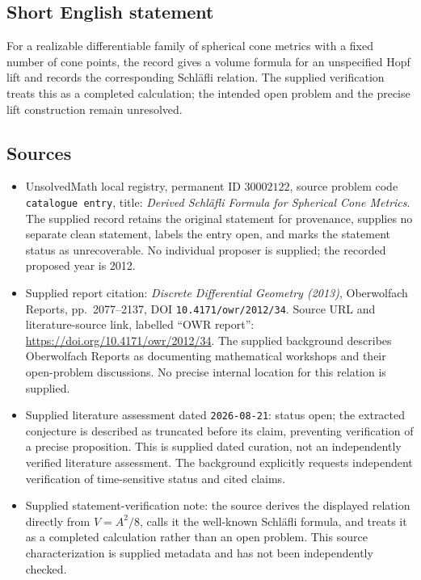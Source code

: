 \documentclass[11pt]{article}
\begin{document}
\subsection{Short English statement}
For a realizable differentiable family of spherical cone metrics with a fixed number of cone points, the record gives a volume formula for an unspecified Hopf lift and records the corresponding Schl\"afli relation. The supplied verification treats this as a completed calculation; the intended open problem and the precise lift construction remain unresolved.
\subsection{Sources}
\begin{itemize}
\item UnsolvedMath local registry, permanent ID \(30002122\), source problem code \texttt{catalogue entry}, title: \emph{Derived Schl\"afli Formula for Spherical Cone Metrics}. The supplied record retains the original statement for provenance, supplies no separate clean statement, labels the entry open, and marks the statement status as unrecoverable. No individual proposer is supplied; the recorded proposed year is 2012.
\item Supplied report citation: \emph{Discrete Differential Geometry (2013)}, Oberwolfach Reports, pp.\ 2077--2137, DOI \texttt{10.4171/owr/2012/34}. Source URL and literature-source link, labelled ``OWR report'': \url{https://doi.org/10.4171/owr/2012/34}. The supplied background describes Oberwolfach Reports as documenting mathematical workshops and their open-problem discussions. No precise internal location for this relation is supplied.
\item Supplied literature assessment dated \texttt{2026-08-21}: status open; the extracted conjecture is described as truncated before its claim, preventing verification of a precise proposition. This is supplied dated curation, not an independently verified literature assessment. The background explicitly requests independent verification of time-sensitive status and cited claims.
\item Supplied statement-verification note: the source derives the displayed relation directly from \(V=A^2/8\), calls it the well-known Schl\"afli formula, and treats it as a completed calculation rather than an open problem. This source characterization is supplied metadata and has not been independently checked.
\end{itemize}
\end{document}
